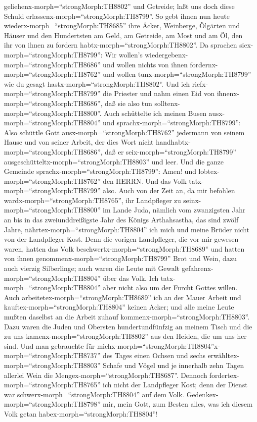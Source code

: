 geliehenx-morph=``strongMorph:TH8802'' und Getreide; laßt uns doch diese
Schuld erlassenx-morph=``strongMorph:TH8799''.  So gebt
ihnen nun heute wiederx-morph=``strongMorph:TH8685'' ihre Äcker,
Weinberge, Ölgärten und Häuser und den Hundertsten am Geld, am Getreide,
am Most und am Öl, den ihr von ihnen zu fordern
habtx-morph=``strongMorph:TH8802''.  Da sprachen
siex-morph=``strongMorph:TH8799'': Wir wollen's
wiedergebenx-morph=``strongMorph:TH8686'' und wollen nichts von ihnen
fordernx-morph=``strongMorph:TH8762'' und wollen
tunx-morph=``strongMorph:TH8799'' wie du gesagt
hastx-morph=``strongMorph:TH8802''. Und ich
riefx-morph=``strongMorph:TH8799'' die Priester und nahm einen Eid von
ihnenx-morph=``strongMorph:TH8686'', daß sie also tun
solltenx-morph=``strongMorph:TH8800''.  Auch schüttelte ich
meinen Busen ausx-morph=``strongMorph:TH8804'' und
sprachx-morph=``strongMorph:TH8799'': Also schüttle Gott
ausx-morph=``strongMorph:TH8762'' jedermann von seinem Hause und von
seiner Arbeit, der dies Wort nicht
handhabtx-morph=``strongMorph:TH8686'', daß er
seix-morph=``strongMorph:TH8799''
ausgeschütteltx-morph=``strongMorph:TH8803'' und leer. Und die ganze
Gemeinde sprachx-morph=``strongMorph:TH8799'': Amen! und
lobtex-morph=``strongMorph:TH8762'' den HERRN. Und das Volk
tatx-morph=``strongMorph:TH8799'' also.  Auch von der Zeit
an, da mir befohlen wardx-morph=``strongMorph:TH8765'', ihr Landpfleger
zu seinx-morph=``strongMorph:TH8800'' im Lande Juda, nämlich vom
zwanzigsten Jahr an bis in das zweiunddreißigste Jahr des Königs
Arthahsastha, das sind zwölf Jahre, nährtex-morph=``strongMorph:TH8804''
ich mich und meine Brüder nicht von der Landpfleger Kost. 
Denn die vorigen Landpfleger, die vor mir gewesen waren, hatten das Volk
beschwertx-morph=``strongMorph:TH8689'' und hatten von ihnen
genommenx-morph=``strongMorph:TH8799'' Brot und Wein, dazu auch vierzig
Silberlinge; auch waren die Leute mit Gewalt
gefahrenx-morph=``strongMorph:TH8804'' über das Volk. Ich
tatx-morph=``strongMorph:TH8804'' aber nicht also um der Furcht Gottes
willen.  Auch arbeitetex-morph=``strongMorph:TH8689'' ich
an der Mauer Arbeit und kauftex-morph=``strongMorph:TH8804'' keinen
Acker; und alle meine Leute mußten daselbst an die Arbeit zuhauf
kommenx-morph=``strongMorph:TH8803''.  Dazu waren die Juden
und Obersten hundertundfünfzig an meinem Tisch und die zu uns
kamenx-morph=``strongMorph:TH8802'' aus den Heiden, die um uns her sind.
 Und man gebrauchte für
michx-morph=``strongMorph:TH8804''x-morph=``strongMorph:TH8737'' des
Tages einen Ochsen und sechs erwähltex-morph=``strongMorph:TH8803''
Schafe und Vögel und je innerhalb zehn Tagen allerlei Wein die
Mengex-morph=``strongMorph:TH8687''. Dennoch
fordertex-morph=``strongMorph:TH8765'' ich nicht der Landpfleger Kost;
denn der Dienst war schwerx-morph=``strongMorph:TH8804'' auf dem Volk.
 Gedenkex-morph=``strongMorph:TH8798'' mir, mein Gott, zum
Besten alles, was ich diesem Volk getan
habex-morph=``strongMorph:TH8804''!

